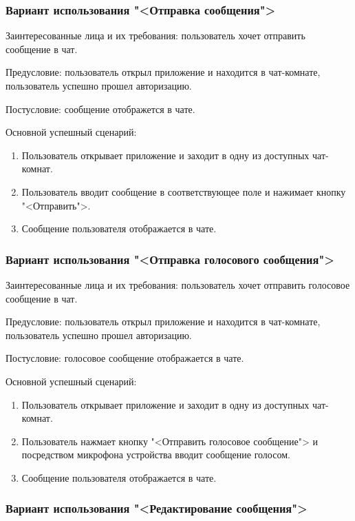 \subsubsection{Вариант использования "<Отправка сообщения">}

Заинтересованные лица и их требования: пользователь хочет отправить сообщение в чат.

Предусловие: пользователь открыл приложение и находится в чат-комнате, пользователь успешно прошел авторизацию.

Постусловие: сообщение отображется в чате.

Основной успешный сценарий:

\begin{enumerate}
	\item Пользователь открывает приложение и заходит в одну из доступных чат-комнат.
	\item Пользователь вводит сообщение в соответствующее поле и нажимает кнопку "<Отправить">.
	\item Сообщение пользователя отображается в чате.
\end{enumerate}

\subsubsection{Вариант использования "<Отправка голосового сообщения">}

Заинтересованные лица и их требования: пользователь хочет отправить голосовое сообщение в чат.

Предусловие: пользователь открыл приложение и находится в чат-комнате, пользователь успешно прошел авторизацию.

Постусловие: голосовое сообщение отображается в чате.

Основной успешный сценарий:

\begin{enumerate}
	\item Пользователь открывает приложение и заходит в одну из доступных чат-комнат.
	\item Пользователь нажмает кнопку "<Отправить голосовое сообщение"> и посредством микрофона устройства вводит сообщение голосом.
	\item Сообщение пользователя отображается в чате.
\end{enumerate}

\subsubsection{Вариант использования "<Редактирование сообщения">}

